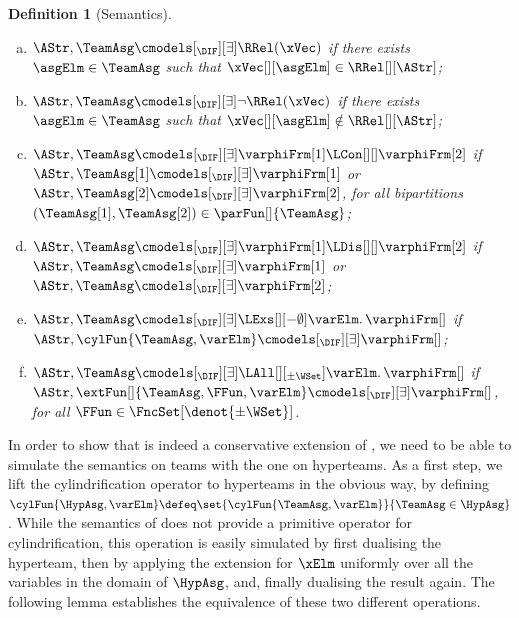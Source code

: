 \documentclass[authoryear]{elsarticle}
\newtheorem{definition}{Definition}
\begin{document}
\begin{definition}[\DIF Semantics]
\begin{enumerate}[1)]
\begin{enumerate}[a)]
    \item\label{def:sem(dif:rel:e)}
      $\AStr, \TeamAsg \cmodels[_{\DIF}][\exists] \RRel(\xVec)$ if there
      exists $\asgElm \in \TeamAsg$ such that $\xVec[][\asgElm] \in
      \RRel[][\AStr]$;
    \item\label{def:sem(dif:neg:e)}
      $\AStr, \TeamAsg \cmodels[_{\DIF}][\exists] \neg \RRel(\xVec)$ if there
      exists $\asgElm \in \TeamAsg$ such that $\xVec[][\asgElm] \notin
      \RRel[][\AStr]$;
    \item\label{def:sem(dif:con:e)}
      $\AStr, \TeamAsg \cmodels[_{\DIF}][\exists] \varphiFrm[1] \LCon[][]
      \varphiFrm[2]$ if $\AStr, \TeamAsg[1] \cmodels[_{\DIF}][\exists]
      \varphiFrm[1]$ or $\AStr, \TeamAsg[2] \cmodels[_{\DIF}][\exists]
      \varphiFrm[2]$, for all bipartitions $(\TeamAsg[1], \TeamAsg[2]) \in
      \parFun[]{\TeamAsg}$;
    \item\label{def:sem(dif:dis:e)}
      $\AStr, \TeamAsg \cmodels[_{\DIF}][\exists] \varphiFrm[1] \LDis[][]
      \varphiFrm[2]$ if $\AStr, \TeamAsg \cmodels[_{\DIF}][\exists]
      \varphiFrm[1]$ or $\AStr, \TeamAsg \cmodels[_{\DIF}][\exists]
      \varphiFrm[2]$;
    \item\label{def:sem(dif:exs:e)}
      $\AStr, \TeamAsg \cmodels[_{\DIF}][\exists] \LExs[][-\emptyset] \varElm
      \ldotp \varphiFrm[]$ if $\AStr, \cylFun{\TeamAsg, \varElm}
      \cmodels[_{\DIF}][\exists] \varphiFrm[]$;
    \item\label{def:sem(dif:all:e)}
      $\AStr, \TeamAsg \cmodels[_{\DIF}][\exists] \LAll[][_{\pm\WSet}]
      \varElm \ldotp \varphiFrm[]$ if $\AStr, \extFun[]{\TeamAsg, \FFun,
      \varElm} \cmodels[_{\DIF}][\exists] \varphiFrm[]$, for all $\FFun \in
      \FncSet[\denot{\pm\WSet}]{}$.
    \end{enumerate}
  \end{enumerate}
\end{definition}

In order to show that \ADIF is indeed a conservative extension of \DIF, we need
to be able to simulate the semantics on teams with the one on hyperteams.
As a first step, we lift the cylindrification operator to hyperteams in the
obvious way, by defining $\cylFun{\HypAsg, \varElm} \defeq \set{
\cylFun{\TeamAsg, \varElm} }{ \TeamAsg \in \HypAsg }$.
While the semantics of \ADIF does not provide a primitive operator for
cylindrification, this operation is easily simulated by first dualising the
hyperteam, then by applying the extension for $\xElm$ uniformly over all the
variables in the domain of $\HypAsg$, and, finally dualising the result again.
The following lemma establishes the equivalence of these two different
operations.
\end{document}

